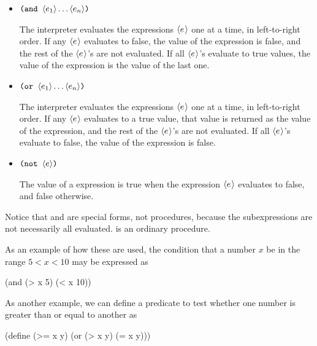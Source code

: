 \begin{itemize}
\item
\( \text{\texttt{(and }} \langle e_1 \rangle \dots \langle e_n \rangle \text{\texttt{)}} \)

The interpreter evaluates the expressions \( \langle{e}\kern0.08em\rangle \) one at a time, in
left-to-right order.  If any \( \langle{e}\kern0.08em\rangle \) evaluates to false, the value of the
 expression is false, and the rest of the \( \langle{e}\kern0.08em\rangle \)'s are not
evaluated.  If all \( \langle{e}\kern0.08em\rangle \)'s evaluate to true values, the value of the
 expression is the value of the last one.

\item
\( \text{\texttt{(or }} \langle e_1 \rangle \dots \langle e_n \rangle \text{\texttt{)}} \)

The interpreter evaluates the expressions \( \langle{e}\kern0.08em\rangle \) one at a time, in
left-to-right order.  If any \( \langle{e}\kern0.08em\rangle \) evaluates to a true value, that value is
returned as the value of the  expression, and the rest of the
\( \langle{e}\kern0.08em\rangle \)'s are not evaluated.  If all \( \langle{e}\kern0.08em\rangle \)'s evaluate to false, the value
of the  expression is false.

\item
\( \text{\texttt{(not }} \langle e \rangle \text{\texttt{)}} \)

The value of a  expression is true when the expression \( \langle{e}\kern0.08em\rangle \)
evaluates to false, and false otherwise.
\end{itemize}

\noindent
Notice that  and  are special forms, not procedures, because
the subexpressions are not necessarily all evaluated.   is an
ordinary procedure.

As an example of how these are used, the condition that a number \( x \) be in
the range \( 5 < x < 10 \) may be expressed as

\begin{codeBlock}
(and (> x 5) (< x 10))
\end{codeBlock}

\noindent
As another example, we can define a predicate to test whether one number is
greater than or equal to another as

\begin{codeBlock}
(define (>= x y) (or (> x y) (= x y)))
\end{codeBlock}

